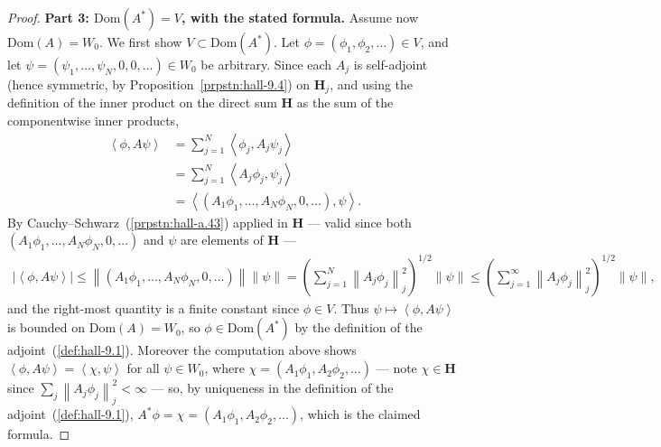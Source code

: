 \begin{proof}
\textbf{Part 3: $\text{Dom}(A^*) = V$, with the stated formula.} Assume now $\text{Dom}(A) = W_0$. We first show $V \subset \text{Dom}(A^*)$. Let $\phi = (\phi_1, \phi_2, \ldots) \in V$, and let $\psi = (\psi_1, \ldots, \psi_N, 0, 0, \ldots) \in W_0$ be arbitrary. Since each $A_j$ is self-adjoint (hence symmetric, by Proposition~\ref{prpstn:hall-9.4}) on $\mathbf{H}_j$, and using the definition of the inner product on the direct sum $\mathbf{H}$ as the sum of the componentwise inner products,
\begin{align}
    \left< \phi, A\psi \right> &= \sum_{j=1}^N \left< \phi_j, A_j \psi_j \right> \\
                &= \sum_{j=1}^N \left< A_j \phi_j, \psi_j \right> \\
                &= \left< (A_1\phi_1, \ldots, A_N\phi_N, 0, \ldots), \psi \right>.
\end{align}
By Cauchy–Schwarz~(\ref{prpstn:hall-a.43}) applied in $\mathbf{H}$ — valid since both $(A_1\phi_1, \ldots, A_N\phi_N, 0, \ldots)$ and $\psi$ are elements of $\mathbf{H}$ —
\begin{align}
    \lvert \left< \phi, A\psi \right> \rvert \le \left\| (A_1\phi_1, \ldots, A_N\phi_N, 0, \ldots) \right\| \left\| \psi \right\| = \left( \sum_{j=1}^N \left\| A_j \phi_j \right\|_j^2 \right)^{1/2} \left\| \psi \right\| \le \left( \sum_{j=1}^\infty \left\| A_j \phi_j \right\|_j^2 \right)^{1/2} \left\| \psi \right\|,
\end{align}
and the right-most quantity is a finite constant since $\phi \in V$. Thus $\psi \mapsto \left< \phi, A\psi \right>$ is bounded on $\text{Dom}(A) = W_0$, so $\phi \in \text{Dom}(A^*)$ by the definition of the adjoint~(\ref{def:hall-9.1}). Moreover the computation above shows $\left< \phi, A\psi \right> = \left< \chi, \psi \right>$ for all $\psi \in W_0$, where $\chi = (A_1\phi_1, A_2\phi_2, \ldots)$ — note $\chi \in \mathbf{H}$ since $\sum_j \left\| A_j\phi_j \right\|_j^2 < \infty$ — so, by uniqueness in the definition of the adjoint~(\ref{def:hall-9.1}), $A^*\phi = \chi = (A_1\phi_1, A_2\phi_2, \ldots)$, which is the claimed formula.


\end{proof}

